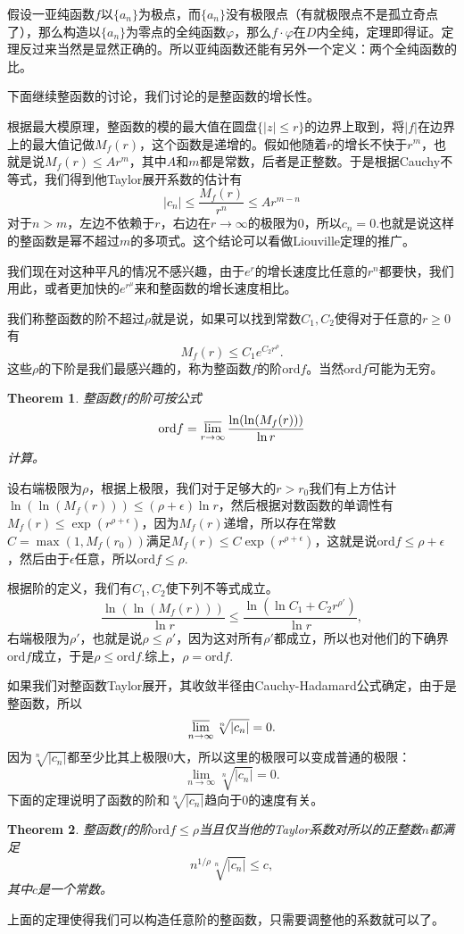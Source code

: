 \documentclass[10pt]{book}
\theoremstyle{plain}%
\newtheorem{theo}{Theorem}[chapter]%
\begin{document}
假设一亚纯函数$f$以$\{a_n\}$为极点，而$\{a_n\}$没有极限点（有就极限点不是孤立奇点了），那么构造以$\{a_n\}$为零点的全纯函数$\varphi$，那么$f\cdot \varphi$在$D$内全纯，定理即得证。定理反过来当然是显然正确的。所以亚纯函数还能有另外一个定义：两个全纯函数的比。

下面继续整函数的讨论，我们讨论的是整函数的增长性。

根据最大模原理，整函数的模的最大值在圆盘$\{|z|\leq r\}$的边界上取到，将$|f|$在边界上的最大值记做$M_f(r)$，这个函数是递增的。假如他随着$r$的增长不快于$r^m$，也就是说$M_f(r)\leq Ar^m$，其中$A$和$m$都是常数，后者是正整数。于是根据Cauchy不等式，我们得到他Taylor展开系数的估计有
\[
|c_n|\leq \frac{M_f(r)}{r^n} \leq A r^{m-n}
\]
对于$n>m$，左边不依赖于$r$，右边在$r\to \infty $的极限为0，所以$c_n=0$.也就是说这样的整函数是幂不超过$m$的多项式。这个结论可以看做Liouville定理的推广。

我们现在对这种平凡的情况不感兴趣，由于$e^r$的增长速度比任意的$r^n$都要快，我们用此，或者更加快的$e^{r^\mu}$来和整函数的增长速度相比。

我们称整函数的阶不超过$\rho$就是说，如果可以找到常数$C_1,C_2$使得对于任意的$r\geq 0$有
\[
M_f(r)\leq C_1 e^{C_2r^\rho}.
\]
这些$\rho$的下阶是我们最感兴趣的，称为整函数$f$的阶$\mathrm{ord} f$。当然$\mathrm{ord} f$可能为无穷。
\begin{theo}
整函数$f$的阶可按公式
\[
\mathrm{ord} f = \varlimsup_{r\to \infty} \frac{\ln(\ln(M_f(r)))}{\ln r}
\]
计算。
\end{theo}

设右端极限为$\rho$，根据上极限，我们对于足够大的$r>r_0$我们有上方估计$\ln(\ln(M_f(r)))\leq (\rho +\epsilon)\ln r$，然后根据对数函数的单调性有$M_f(r)\leq \exp(r^{\rho +\epsilon})$，因为$M_f(r)$递增，所以存在常数$C=\max(1,M_f(r_0))$满足$M_f(r)\leq C\exp(r^{\rho +\epsilon})$，这就是说$\mathrm{ord} f \leq \rho+ \epsilon$，然后由于$\epsilon$任意，所以$\mathrm{ord} f \leq \rho$.

根据阶的定义，我们有$C_1,C_2$使下列不等式成立。
\[
\frac{\ln(\ln(M_f(r)))}{\ln r}\leq \frac{\ln(\ln C_1+C_2 r^{\rho'})}{\ln r},
\]
右端极限为$\rho'$，也就是说$\rho \leq \rho'$，因为这对所有$\rho'$都成立，所以也对他们的下确界$\mathrm{ord} f$成立，于是$\rho \leq \mathrm{ord} f$.综上，$\rho = \mathrm{ord} f$.

如果我们对整函数Taylor展开，其收敛半径由Cauchy-Hadamard公式确定，由于是整函数，所以\[\varlimsup_{n\to \infty} \sqrt[n]{|c_n|}=0.\]因为$\sqrt[n]{|c_n|}$都至少比其上极限0大，所以这里的极限可以变成普通的极限：\[\lim_{n\to \infty} \sqrt[n]{|c_n|}=0.\]下面的定理说明了函数的阶和$ \sqrt[n]{|c_n|}$趋向于0的速度有关。
\begin{theo}
整函数$f$的阶$\mathrm{ord} f \leq \rho$当且仅当他的Taylor系数对所以的正整数$n$都满足
\[
n^{1/\rho}\sqrt[n]{|c_n|}\leq c,
\]
其中$c$是一个常数。
\end{theo}
上面的定理使得我们可以构造任意阶的整函数，只需要调整他的系数就可以了。
\end{document}
